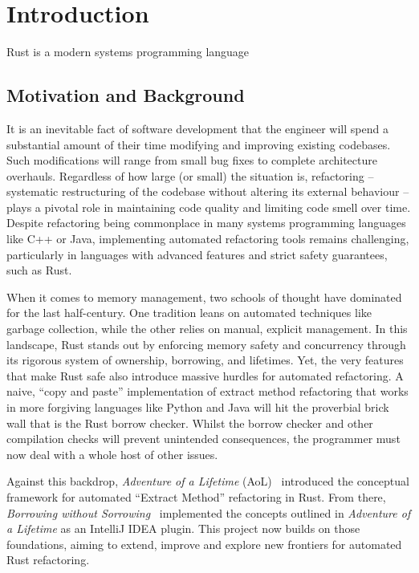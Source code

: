 \setcounter{chapter}{-1} %
\chapter{Introduction}
\label{chap:introduction}

Rust is a modern systems programming language

\section{Motivation and Background}
\label{sec:motivation}

It is an inevitable fact of software development that the engineer will spend a
substantial amount of their time modifying and improving existing codebases.
Such modifications will range from small bug fixes to complete architecture
overhauls. Regardless of how large (or small) the situation is, refactoring –
systematic restructuring of the codebase without altering its external behaviour
– plays a pivotal role in maintaining code quality and limiting code smell over
time. Despite refactoring being commonplace in many systems programming
languages like C++ or Java, implementing automated refactoring tools remains
challenging, particularly in languages with advanced features and strict safety
guarantees, such as Rust.

When it comes to memory management, two schools of thought have dominated for
the last half-century. One tradition leans on automated techniques like garbage
collection, while the other relies on manual, explicit management. In this
landscape, Rust stands out by enforcing memory safety and concurrency through
its rigorous system of ownership, borrowing, and lifetimes. Yet, the very
features that make Rust safe also introduce massive hurdles for automated
refactoring. A naive, “copy and paste” implementation of extract method
refactoring that works in more forgiving languages like Python and Java will hit
the proverbial brick wall that is the Rust borrow checker. Whilst the borrow
checker and other compilation checks will prevent unintended consequences, the
programmer must now deal with a whole host of other issues.

Against this backdrop, \textit{Adventure of a Lifetime} (AoL)~\cite{aol}
introduced the conceptual framework for automated “Extract Method” refactoring
in Rust. From there, \textit{Borrowing without Sorrowing}~\cite{borrowing}
implemented the concepts outlined in \textit{Adventure of a Lifetime} as an
IntelliJ IDEA plugin. This project now builds on those foundations, aiming to
extend, improve and explore new frontiers for automated Rust refactoring.

